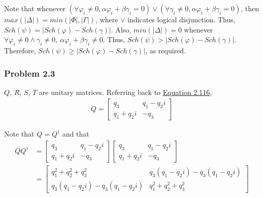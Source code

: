 \begin{enumerate}
    Note that whenever
    $(\forall \varphi_i \neq 0, \alpha \varphi_i + \beta \gamma_i = 0) \lor
    (\forall \gamma_i \neq 0, \alpha \varphi_i + \beta \gamma_i = 0)$,
    then $max(|\Delta|) = min(|\Phi|, |\Gamma|)$,
    where $\lor$ indicates logical disjunction.
    Thus, $Sch(\psi) = |Sch(\varphi) - Sch(\gamma)|$.
    Also, $min(|\Delta|) = 0$ whenever
    $\forall \varphi_i \neq 0 \land \gamma_i \neq 0,\ \alpha \varphi_i + \beta \gamma_i \neq 0$.
    Thus, $Sch(\psi) > |Sch(\varphi) - Sch(\gamma)|$.
    Therefore, $Sch(\psi) \geq |Sch(\varphi) - Sch(\gamma)|$, as required.
    
\end{enumerate}


\subsubsection{Problem 2.3}

$Q$, $R$, $S$, $T$ are unitary matrices.
Referring back to
\hyperref[sec:nielsen-and-chuang-equation-2-116]{Equation 2.116},
%
\begin{align}
    Q = \left[ \begin{matrix}
        q_3 & q_1 - q_2i \\
        q_1 + q_2i & - q_3
        \end{matrix} \right]
\end{align}

Note that $Q = Q^\dagger$ and that
%
\begin{align}
    Q Q^\dagger &= \left[ \begin{matrix}
        q_3 & q_1 - q_2i \\
        q_1 + q_2i & - q_3
        \end{matrix} \right]
        \left[ \begin{matrix}
        q_3 & q_1 - q_2i \\
        q_1 + q_2i & - q_3
        \end{matrix} \right] \\[5pt]
    &= \left[ \begin{matrix}
        q_1^2 + q_2^2 + q_3^2 & q_3(q_1 - q_2i) - q_3(q_1 - q_2i) \\
        q_3(q_1 - q_2i) - q_3(q_1 - q_2i) & q_1^2 + q_2^2 + q_3^2
        \end{matrix} \right]
\end{align}

